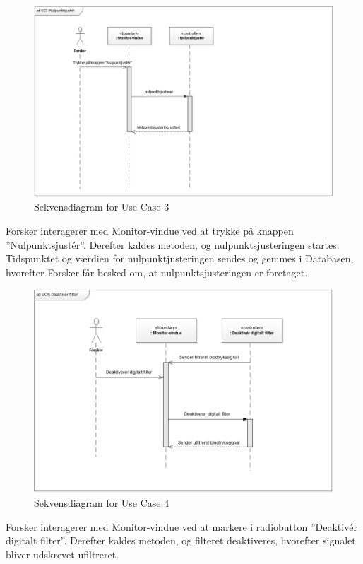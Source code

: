 \begin{figure}[H]
	\centering
	\includegraphics[width=1\textwidth]{Figurer/UC3_SD}
	\caption{Sekvensdiagram for Use Case 3}
\end{figure}

Forsker interagerer med Monitor-vindue ved at trykke på knappen ”Nulpunktsjustér”. Derefter kaldes metoden, og nulpunktsjusteringen startes. Tidspunktet og værdien for nulpunktjusteringen sendes og gemmes i Databasen, hvorefter Forsker får besked om, at nulpunktsjusteringen er foretaget. 

\begin{figure}[H]
	\centering
	\includegraphics[width=1\textwidth]{Figurer/UC4_SD}
	\caption{Sekvensdiagram for Use Case 4}
\end{figure}

Forsker interagerer med Monitor-vindue ved at markere i radiobutton ”Deaktivér digitalt filter”. Derefter kaldes metoden, og filteret deaktiveres, hvorefter signalet bliver udskrevet ufiltreret.

